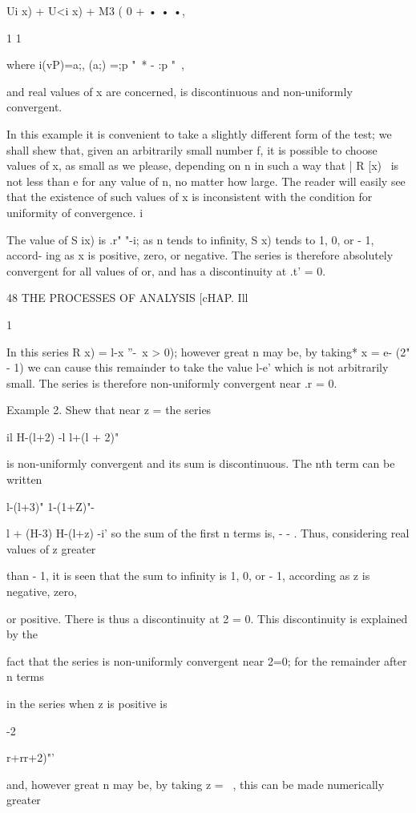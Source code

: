 Ui x) + U<i x) + M3 ( 0 + • • •,

1 1

where i(vP)=a;, (a;) =;p "~* - :p "~,

and real values of x are concerned, is discontinuous and non-uniformly
convergent.

In this example it is convenient to take a slightly different form of
the test; we shall shew that, given an arbitrarily small number f, it
is possible to choose values of x, as small as we please, depending on
n in such a way that | R [x) \ is not less than e for any value of n,
no matter how large. The reader will easily see that the existence of
such values of x is inconsistent with the condition for uniformity of
convergence. i\

The value of S ix) is .r" "-i; as n tends to infinity, S x) tends to
1, 0, or - 1, accord- ing as x is positive, zero, or negative. The
series is therefore absolutely convergent for all values of or, and
has a discontinuity at .t' = 0.



48 THE PROCESSES OF ANALYSIS [cHAP. Ill

1

In this series R x) = l-x ''-\ x > 0); however great n may be, by
taking* x = e- (2" - 1) we can cause this remainder to take the value
l-e' which is not arbitrarily small. The series is therefore
non-uniformly convergent near .r = 0.

Example 2. Shew that near z = the series

 il H-(l+2) -l l+(l + 2)"

is non-uniformly convergent and its sum is discontinuous. The nth term
can be written

l-(l+3)" 1-(1+Z)"-

l + (H-3) H-(l+z) -i' so the sum of the first n terms is, - - . Thus,
considering real values of z greater

than - 1, it is seen that the sum to infinity is 1, 0, or - 1,
according as z is negative, zero,

or positive. There is thus a discontinuity at 2 = 0. This
discontinuity is explained by the

fact that the series is non-uniformly convergent near 2=0; for the
remainder after n terms

in the series when z is positive is

-2

r+rr+2)"'

and, however great n may be, by taking z = ~, this can be made
numerically greater

